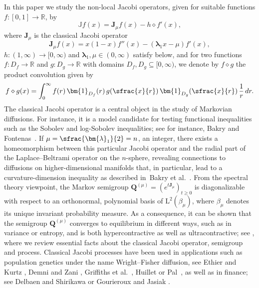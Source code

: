 \documentclass[JEP,XML,SOM,Unicode]{cedram}
\theoremstyle{plain}
\theoremstyle{definition}
\newcommand{\R}{\mathbb{R}}
\newcommand{\calJ}{\mathds{J}}
\newcommand{\Leb}{\mathrm{L}}
\newcommand{\calJd}{\mathbf{J}}
\newcommand{\lam}{{\bm{\lambda}_1}}
\newcommand{\Q}[1][\mo]{\mathbf{Q}^{({#1})}}
\newcommand{\gab}[1][\lam,\mo]{{\beta_{#1}}}
\let\mo\mu
\begin{document}
In this paper we study the non-local Jacobi operators, given for suitable functions $f \colon [0,1] \to \R$, by
\begin{equation}
\label{eq:defJ}
\calJ f(x) = \calJd_\mo f(x) - h \diamond f'(x),
\end{equation}
where $\calJd_\mo$ is the classical Jacobi operator
\begin{equation*}
\calJd_\mo f(x)= x (1-x)f''(x)-\left(\lam x-\mo\right)f'(x),
\end{equation*}
$h \colon (1,\infty) \to [0,\infty)$ and $\lam, \mo \in (0, \infty)$ satisfy  below,
and for two func\-tions $f \colon D_f \to \R$ and $g \colon D_g \to \R$ with domains $D_f, D_g \subseteq [0, \infty)$,
we denote by $f \diamond g$ the product convolution given by
\begin{equation}
\label{eq:defd}
f \diamond g(x) = \int_0^{\infty} f(r)\, \bm{1}_{D_f}(r)\, g(\sfrac{x}{r})\, \bm{1}_{D_g}(\sfrac{x}{r})\, \frac{1}{r}\, dr.
\end{equation}
The classical Jacobi operator is a central object in the study of Markovian diffusions. For instance, it is a model candidate for testing functional inequalities such as the Sobolev and log-Sobolev inequalities; see for instance, Bakry \cite{Bakry-Jacobi} and Fontenas~\cite{fontenas:1998}. If $\mo = \sfrac{\lam}{2} = n$, an integer, there exists a homeomorphism between this particular Jacobi operator and the radial part of the Laplace--Beltrami operator on the $n$-sphere, revealing connections to diffusions on higher-dimensional manifolds that, in particular, lead to a curvature-dimension inequality as described in~Bakry et al.~\cite[Chap.\,2.7]{Bakry_Book}. From the spectral theory viewpoint, the Markov semigroup $\Q[\mo] = (e^{t\calJd_\mo})_{t \geq 0}$ is diagonalizable with respect to an orthonormal, polynomial basis of $\Leb^2(\gab[\mo])$, where $\gab[\mo]$ denotes its unique invariant probability measure. As a consequence, it can be shown that the semigroup $\Q[\mo]$ converges to equilibrium in different ways, such as in variance or entropy, and is both hypercontractive as well as ultracontractive; see , where we review essential facts about the classical Jacobi operator, semigroup and process. Classical
Jacobi processes have been used in applications such as population genetics under the name Wright--Fisher diffusion, see \eg Ethier and Kurtz \cite[Chap.\,10]{EthierKurtz}, Demni and Zani \cite{dem}, Griffiths et al.~\cite{griffiths:2010,griffiths2018}, Huillet \cite{huillet2007wright} or Pal~\cite{pal2013},
as well as in finance; see \eg Delbaen and Shirikawa \cite{delbaen2002interest} or Gourieroux and Jasiak \cite{gourieroux2006}.
\end{document}
